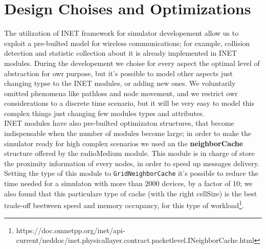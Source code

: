 \section{Design Choises and Optimizations}
The utilization of INET framework for simulator developement allow us to exploit a pre-builted model for wireless communications;
for example, collision detection and statistic collection about it is already implemented in INET modules. During the developement
we choise for every aspect the optimal level of abstraction for owr purpose, but it's possible to model other aspects just 
changing typse to the INET modules, or adding new ones. We voluntarily omitted phenomena like pathloss and node movement, and we 
restrict owr considerations to a discrete time scenario, but it will be very easy to model this complex things just changing
few modules types and attributes. \\
INET modules have also pre-builted optimizaton structures, that become indispensable when the number of modules become large; in order
to make the simulator ready for high complex scenarios we used an the \textbf{neighborCache} structure offered by the radioMedium module.
This module is in charge of store the proximity information of every nodes, in order to speed up messages delivery. Setting the type of this
module to \texttt{GridNeighborCache} it's possible to reduce the time needed for a simulaton with more than 2000 devices, by a factor of 
10; we also found that this particulare type of cache (with the right cellSize) is the best trade-off beetween speed and memory occupancy,
for this type of workload\footnote{https://doc.omnetpp.org/inet/api-current/neddoc/inet.physicallayer.contract.packetlevel.INeighborCache.html}.  